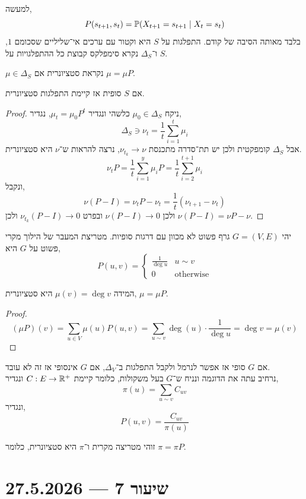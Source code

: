 למעשה,
\[
	P(s_{t + 1}, s_t)
	= \mathbb{P}(X_{t + 1} = s_{t + 1} \mid X_t = s_t)
\]
בלבד מאותה הסיבה של קודם.
התפלגות על $S$ היא וקטור עם ערכים אי־שליליים שסכומם $1$, ו־$\Delta_S$ נקרא סימפלקס קבוצת כל ההתפלגויות על $S$.
\begin{definition}[סטציונרית]
	$\mu \in \Delta_S$ נקראת סטציונרית אם $\mu = \mu P$.
\end{definition}
\begin{proposition}
	אם $S$ סופית אז קיימת התפלגות סטציונרית.
\end{proposition}
\begin{proof}
	ניקח $\mu_0 \in \Delta_S$ כלשהי ונגדיר $\mu_t = \mu_0 P^t$, נגדיר,
	\[
		\Delta_S \ni
		\nu_t
		= \frac{1}{t} \sum_{i = 1}^t \mu_i
	\]
	אבל $\Delta_S$ קומפקטית ולכן יש תת־סדרה מתכנסת $\nu_{t_k} \to \nu$, נרצה להראות ש־$\nu$ היא סטציונרית.
	\[
		\nu_t P
		= \frac{1}{t} \sum_{i = 1}^y \mu_i P
		= \frac{1}{t} \sum_{i = 2}^{t + 1} \mu_i
	\]
	ונקבל,
	\[
		\nu(P - I)
		= \nu_t P - \nu_t
		= \frac{1}{t} (\nu_{t + 1} - \nu_t)
	\]
	ולכן $\nu(P - I) \to 0$ ובפרט $\nu_{t_k} (P - I) \to 0$ ולכן $\nu(P - I) = \nu P - \nu$.
\end{proof}
\begin{example}
	יהי $G = (V, E)$ גרף פשוט לא מכוון עם דרגות סופיות.
	מטריצת המעבר של הילוך מקרי פשוט על $G$ היא,
	\[
		P(u, v)
		= \begin{cases}
			\frac{1}{\deg u} & u \sim v \\
			0 & \text{otherwise}
		\end{cases}
	\]
\end{example}
\begin{proposition}
	המידה $\mu(v) = \deg v$ היא סטציונרית, $\mu = \mu P$.
\end{proposition}
\begin{proof}
	\[
		(\mu P)(v)
		= \sum_{u \in V} \mu(u) P(u, v)
		= \sum_{u \sim v} \deg(u) \cdot \frac{1}{\deg u}
		= \deg v
		= \mu(v)
	\]
\end{proof}
אם $G$ סופי אז אפשר לנרמל ולקבל התפלגות ב־$\Delta_V$, אם $G$ אינסופי אז זה לא עובד. \\
נרחיב עתה את הדוגמה ונניח ש־$G$ בעל משקולות, כלומר קיימת $C : E \to \mathbb{R}^+$ ונגדיר,
\[
	\pi(u)
	= \sum_{u \sim v} C_{uv}
\]
ונגדיר,
\[
	P(u, v)
	= \frac{C_{uv}}{\pi(u)}
\]
\begin{proposition}
	זוהי מטריצה מקרית ו־$\pi$ היא סטציונרית, כלומר $\pi = \pi P$.
\end{proposition}

\section{שיעור 7 --- 27.5.2026}

